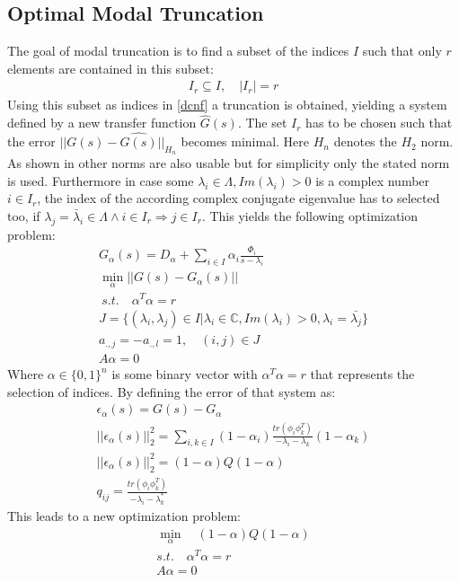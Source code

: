 \subsection{Optimal Modal Truncation}
The goal of modal truncation is to find a subset of the indices \(I\)  such that only \(r\) elements are contained in this subset:
\begin{gather}
I_r \subseteq I, \quad |I_r| = r
\end{gather}
Using this subset as indices in \ref{dcnf} a truncation is obtained, yielding a system defined by a new transfer function \(\hat{G}(s)\).
The set \(I_r\) has to be chosen such that the error \(||G(s) - \hat{G(s)}||_{H_n}\) becomes minimal.
Here  \(H_n\) denotes the \(H_2\)  norm.
As shown in \cite{vuillemin2020optimal} other norms are also usable but for simplicity only the stated norm is used.
Furthermore in case some \(\lambda_i \in \Lambda, Im(\lambda_i) > 0\) is a complex number  \(i \in I_r\), the index of the according complex conjugate eigenvalue has to selected too, if \(\lambda_j = \bar{\lambda}_i \in \Lambda \wedge i \in I_r \Rightarrow j \in I_r\). 
This yields the following optimization problem:
\begin{gather}
G_{\alpha}(s) = D_{\alpha} + \sum_{i \in I} \alpha_i \frac{\Phi_i}{s - \lambda_i} \\ 
\min_{\alpha} ||G(s) - G_{\alpha}(s)|| \\\ s.t. \quad
\alpha^{T}\alpha = r \\
J = \{(\lambda_i, \lambda_j) \in I | \lambda_i \in \mathbb{C}, Im(\lambda_i) > 0, \lambda_i = \bar{\lambda_j}\} \\
a_{.,j} = -a_{.,l} = 1, \quad	(i, j) \in J \\
A\alpha = 0
\end{gather}
Where \(\alpha \in \{0, 1\}^{n}\) is some binary vector with \(\alpha^{T} \alpha = r\) that represents the selection of indices.
By defining the error of that system as:
\begin{gather}
\epsilon_{\alpha}(s) = G(s) - G_{\alpha} \\
||\epsilon_{\alpha}(s)||_2^2 = \sum_{i, k \in I} (1-\alpha_i) \frac{tr(\phi_i \phi_k^{T})}{-\lambda_i - \lambda_k}(1-\alpha_k) \\
||\epsilon_{\alpha}(s)||_2^2 = (1-\alpha)Q(1-\alpha) \\
q_{ij} = \frac{tr(\phi_i \phi_k^{T})}{-\lambda_i - \lambda_k^*}
\end{gather} 
This leads to a new optimization problem:
\begin{gather}
\min_{\alpha} \quad (1-\alpha)Q(1-\alpha) \label{opt-h2}\\
s.t. \quad \alpha^T\alpha = r \\
A\alpha = 0
\end{gather}
\cite{vuillemin2020optimal}
